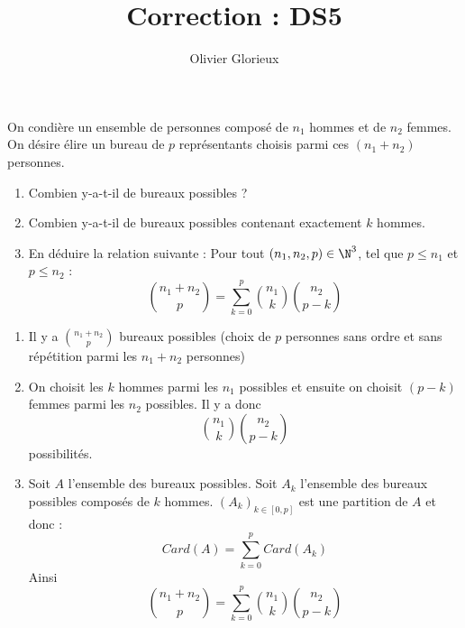 \documentclass[a4paper, 11pt,reqno]{article}
\author{Olivier Glorieux}
\begin{document}
\title{Correction : DS5
}

\begin{exercice}
On condière un ensemble de personnes composé de $n_1$ hommes et de $n_2 $ femmes. On désire élire un bureau de $p$ représentants choisis parmi ces $(n_1+n_2)$ personnes. 
\begin{enumerate}
\item Combien y-a-t-il  de bureaux possibles ? 
\item Combien y-a-t-il  de bureaux possibles contenant exactement $k$ hommes. 
\item En déduire la relation suivante :
Pour tout $(n_1, n_2 , p )\in \N^3$, tel que $p\leq n_1$ et $p\leq n_2$ :
$$\binom{n_1+n_2}{p} =\sum_{k=0}^p \binom{n_1}{k}\binom{n_2}{p-k}$$

\end{enumerate}
\end{exercice}
\begin{correction}
\begin{enumerate}
\item Il y a $\binom{n_1+n_2}{p}$ bureaux possibles (choix de $p$ personnes sans ordre et sans répétition parmi les  $n_1+n_2$ personnes)
\item On choisit les $k$ hommes parmi les $n_1$ possibles et ensuite on choisit $(p-k)$ femmes parmi les $n_2$ possibles. Il y a donc 
$$\binom{n_1}{k}\binom{n_2}{p-k}$$ 
possibilités. 
\item Soit $A$ l'ensemble des bureaux possibles. 
Soit $A_k$ l'ensemble des bureaux  possibles composés de $k$ hommes. 
$(A_k)_{k\in [0,p]}  $ est une partition de $A$ et donc : 
$$Card(A)  =\sum_{k=0}^p Card(A_k)$$
Ainsi 
$$\binom{n_1+n_2}{p}= \sum_{k=0}^p \binom{n_1}{k}\binom{n_2}{p-k}$$ 

\end{enumerate}
\end{correction}
\end{document}
